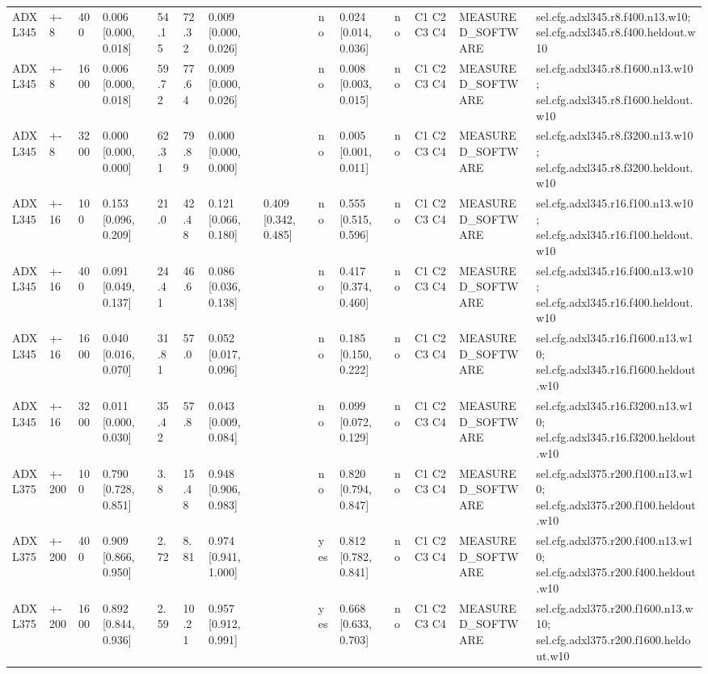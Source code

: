 \begin{table}[t]
\begin{tabular}{llllllllllllll}
ADXL345 & +-8 & 400 & 0.006 [0.000, 0.018] & 54.15 & 72.32 & 0.009 [0.000, 0.026] &  & no & 0.024 [0.014, 0.036] & no & C1 C2 C3 C4 & MEASURED\_SOFTWARE & sel.cfg.adxl345.r8.f400.n13.w10; sel.cfg.adxl345.r8.f400.heldout.w10 \\
ADXL345 & +-8 & 1600 & 0.006 [0.000, 0.018] & 59.72 & 77.64 & 0.009 [0.000, 0.026] &  & no & 0.008 [0.003, 0.015] & no & C1 C2 C3 C4 & MEASURED\_SOFTWARE & sel.cfg.adxl345.r8.f1600.n13.w10; sel.cfg.adxl345.r8.f1600.heldout.w10 \\
ADXL345 & +-8 & 3200 & 0.000 [0.000, 0.000] & 62.31 & 79.89 & 0.000 [0.000, 0.000] &  & no & 0.005 [0.001, 0.011] & no & C1 C2 C3 C4 & MEASURED\_SOFTWARE & sel.cfg.adxl345.r8.f3200.n13.w10; sel.cfg.adxl345.r8.f3200.heldout.w10 \\
ADXL345 & +-16 & 100 & 0.153 [0.096, 0.209] & 21.0 & 42.48 & 0.121 [0.066, 0.180] & 0.409 [0.342, 0.485] & no & 0.555 [0.515, 0.596] & no & C1 C2 C3 C4 & MEASURED\_SOFTWARE & sel.cfg.adxl345.r16.f100.n13.w10; sel.cfg.adxl345.r16.f100.heldout.w10 \\
ADXL345 & +-16 & 400 & 0.091 [0.049, 0.137] & 24.41 & 46.6 & 0.086 [0.036, 0.138] &  & no & 0.417 [0.374, 0.460] & no & C1 C2 C3 C4 & MEASURED\_SOFTWARE & sel.cfg.adxl345.r16.f400.n13.w10; sel.cfg.adxl345.r16.f400.heldout.w10 \\
ADXL345 & +-16 & 1600 & 0.040 [0.016, 0.070] & 31.81 & 57.0 & 0.052 [0.017, 0.096] &  & no & 0.185 [0.150, 0.222] & no & C1 C2 C3 C4 & MEASURED\_SOFTWARE & sel.cfg.adxl345.r16.f1600.n13.w10; sel.cfg.adxl345.r16.f1600.heldout.w10 \\
ADXL345 & +-16 & 3200 & 0.011 [0.000, 0.030] & 35.42 & 57.8 & 0.043 [0.009, 0.084] &  & no & 0.099 [0.072, 0.129] & no & C1 C2 C3 C4 & MEASURED\_SOFTWARE & sel.cfg.adxl345.r16.f3200.n13.w10; sel.cfg.adxl345.r16.f3200.heldout.w10 \\
ADXL375 & +-200 & 100 & 0.790 [0.728, 0.851] & 3.8 & 15.48 & 0.948 [0.906, 0.983] &  & no & 0.820 [0.794, 0.847] & no & C1 C2 C3 C4 & MEASURED\_SOFTWARE & sel.cfg.adxl375.r200.f100.n13.w10; sel.cfg.adxl375.r200.f100.heldout.w10 \\
ADXL375 & +-200 & 400 & 0.909 [0.866, 0.950] & 2.72 & 8.81 & 0.974 [0.941, 1.000] &  & yes & 0.812 [0.782, 0.841] & no & C1 C2 C3 C4 & MEASURED\_SOFTWARE & sel.cfg.adxl375.r200.f400.n13.w10; sel.cfg.adxl375.r200.f400.heldout.w10 \\
ADXL375 & +-200 & 1600 & 0.892 [0.844, 0.936] & 2.59 & 10.21 & 0.957 [0.912, 0.991] &  & yes & 0.668 [0.633, 0.703] & no & C1 C2 C3 C4 & MEASURED\_SOFTWARE & sel.cfg.adxl375.r200.f1600.n13.w10; sel.cfg.adxl375.r200.f1600.heldout.w10 \\

\end{tabular}
\end{table}
